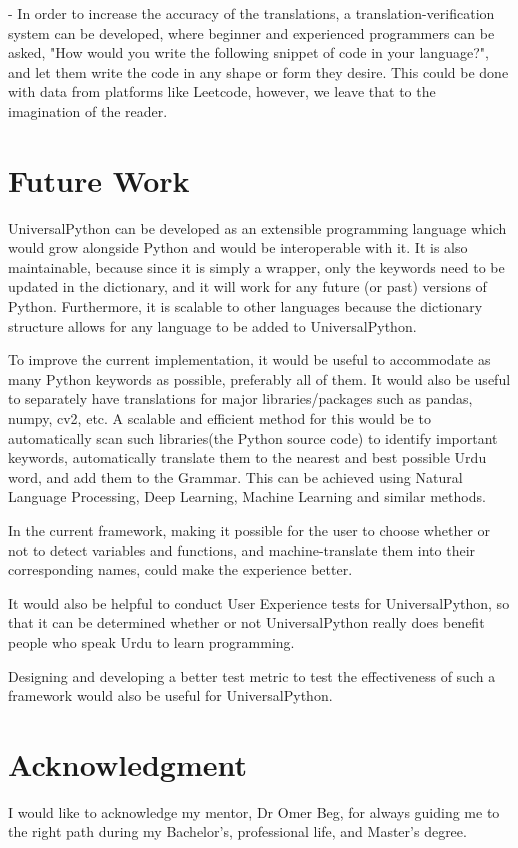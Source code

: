 \documentclass[conference]{IEEEtran}
\begin{document}
- In order to increase the accuracy of the translations, a translation-verification system can be developed, where beginner and experienced programmers can be asked, "How would you write the following snippet of code in your language?", and let them write the code in any shape or form they desire. This could be done with data from platforms like Leetcode, however, we leave that to the imagination of the reader.


\section{Future Work}

UniversalPython can be developed as an extensible programming language which would grow alongside Python and would be interoperable with it. It is also maintainable, because since it is simply a wrapper, only the keywords need to be updated in the dictionary, and it will work for any future (or past) versions of Python. Furthermore, it is scalable to other languages because the dictionary structure allows for any language to be added to UniversalPython.

To improve the current implementation, it would be useful to accommodate as many Python keywords as possible, preferably all of them. It would also be useful to separately have translations for major libraries/packages such as pandas, numpy, cv2, etc. A scalable and eﬀicient method for this would be to automatically scan such libraries(the Python source code) to identify important keywords, automatically translate them to the nearest and best possible Urdu word, and add them to the Grammar. This can be achieved using Natural Language Processing, Deep Learning, Machine Learning and similar methods.

In the current framework, making it possible for the user to choose whether or not to detect variables and functions, and machine-translate them into their corresponding names, could make the experience better.

It would also be helpful to conduct User Experience tests for UniversalPython, so that it can be determined whether or not UniversalPython really does benefit people who speak Urdu to learn programming.

Designing and developing a better test metric to test the effectiveness of such a framework would also be useful for UniversalPython.

\section*{Acknowledgment}

I would like to acknowledge my mentor, Dr Omer Beg, for always guiding me to the right path during my Bachelor's, professional life, and Master's degree.

 

\vspace{12pt}
\end{document}
